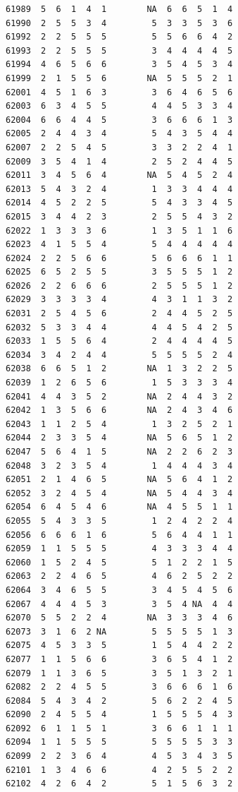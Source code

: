 \documentclass[
  letterpaper,
  DIV=11,
  numbers=noendperiod]{scrreprt}
\begin{document}
\begin{verbatim}
61989  5  6  1  4  1        NA  6  6  5  1  4
61990  2  5  5  3  4         5  3  3  5  3  6
61992  2  2  5  5  5         5  5  6  6  4  2
61993  2  2  5  5  5         3  4  4  4  4  5
61994  4  6  5  6  6         3  5  4  5  3  4
61999  2  1  5  5  6        NA  5  5  5  2  1
62001  4  5  1  6  3         3  6  4  6  5  6
62003  6  3  4  5  5         4  4  5  3  3  4
62004  6  6  4  4  5         3  6  6  6  1  3
62005  2  4  4  3  4         5  4  3  5  4  4
62007  2  2  5  4  5         3  3  2  2  4  1
62009  3  5  4  1  4         2  5  2  4  4  5
62011  3  4  5  6  4        NA  5  4  5  2  4
62013  5  4  3  2  4         1  3  3  4  4  4
62014  4  5  2  2  5         5  4  3  3  4  5
62015  3  4  4  2  3         2  5  5  4  3  2
62022  1  3  3  3  6         1  3  5  1  1  6
62023  4  1  5  5  4         5  4  4  4  4  4
62024  2  2  5  6  6         5  6  6  6  1  1
62025  6  5  2  5  5         3  5  5  5  1  2
62026  2  2  6  6  6         2  5  5  5  1  2
62029  3  3  3  3  4         4  3  1  1  3  2
62031  2  5  4  5  6         2  4  4  5  2  5
62032  5  3  3  4  4         4  4  5  4  2  5
62033  1  5  5  6  4         2  4  4  4  4  5
62034  3  4  2  4  4         5  5  5  5  2  4
62038  6  6  5  1  2        NA  1  3  2  2  5
62039  1  2  6  5  6         1  5  3  3  3  4
62041  4  4  3  5  2        NA  2  4  4  3  2
62042  1  3  5  6  6        NA  2  4  3  4  6
62043  1  1  2  5  4         1  3  2  5  2  1
62044  2  3  3  5  4        NA  5  6  5  1  2
62047  5  6  4  1  5        NA  2  2  6  2  3
62048  3  2  3  5  4         1  4  4  4  3  4
62051  2  1  4  6  5        NA  5  6  4  1  2
62052  3  2  4  5  4        NA  5  4  4  3  4
62054  6  4  5  4  6        NA  4  5  5  1  1
62055  5  4  3  3  5         1  2  4  2  2  4
62056  6  6  6  1  6         5  6  4  4  1  1
62059  1  1  5  5  5         4  3  3  3  4  4
62060  1  5  2  4  5         5  1  2  2  1  5
62063  2  2  4  6  5         4  6  2  5  2  2
62064  3  4  6  5  5         3  4  5  4  5  6
62067  4  4  4  5  3         3  5  4 NA  4  4
62070  5  5  2  2  4        NA  3  3  3  4  6
62073  3  1  6  2 NA         5  5  5  5  1  3
62075  4  5  3  3  5         1  5  4  4  2  2
62077  1  1  5  6  6         3  6  5  4  1  2
62079  1  1  3  6  5         3  5  1  3  2  1
62082  2  2  4  5  5         3  6  6  6  1  6
62084  5  4  3  4  2         5  6  2  2  4  5
62090  2  4  5  5  4         1  5  5  5  4  3
62092  6  1  1  5  1         3  6  6  1  1  1
62094  1  1  5  5  5         5  5  5  5  3  3
62099  2  2  3  6  4         4  5  3  4  3  5
62101  1  3  4  6  6         4  2  5  5  2  2
62102  4  2  6  4  2         5  1  5  6  3  2

\end{verbatim}
\end{document}
